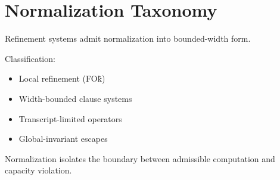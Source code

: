 \chapter{Normalization Taxonomy}

Refinement systems admit normalization into bounded-width form.

Classification:

\begin{itemize}
\item Local refinement (FO\^k)
\item Width-bounded clause systems
\item Transcript-limited operators
\item Global-invariant escapes
\end{itemize}

Normalization isolates the boundary
between admissible computation and capacity violation.
